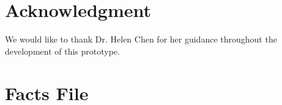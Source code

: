 \documentclass[conference]{IEEEtran}
\begin{document}
\section*{Acknowledgment}


We would like to thank Dr. Helen Chen for her guidance throughout the development of this prototype.  









\appendices

\onecolumn

\section{Facts File}
\label{sec:facts-file}
\end{document}
